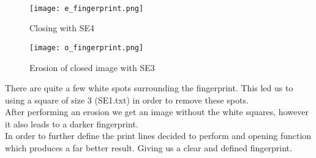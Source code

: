 \documentclass[a4paper]{article}
\begin{document}
\\
\begin{figure}[ht] 
  \label{ fig7} 
  \begin{minipage}[b]{0.5\linewidth}
    \centering
    \texttt{[image: e\_fingerprint.png]} 
    \caption{Closing with SE4} 
    \vspace{4ex}
  \end{minipage}%
  \begin{minipage}[b]{0.5\linewidth}
    \centering
    \texttt{[image: o\_fingerprint.png]} 
    \caption{Erosion of closed image with SE3} 
    \vspace{4ex}
  \end{minipage} 
\end{figure} 

There are quite a few white spots surrounding the fingerprint. This led us to using a square of size 3 (SE1.txt) in order to remove these spots.\\

After performing an erosion we get an image without the white squares, however it also leads to a darker fingerprint.\\

In order to further define the print lines decided to perform and opening function which produces a far better result. Giving us a clear and defined fingerprint.
\end{document}
